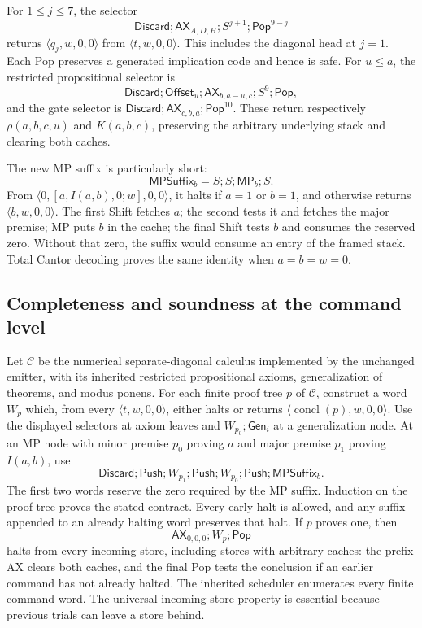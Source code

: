 For $1\le j\le7$, the selector
\[
 \mathsf{Discard};\mathsf{AX}_{A,D,H};S^{j+1};\mathsf{Pop}^{9-j}
\]
returns $\langle q_j,w,0,0\rangle$ from
$\langle t,w,0,0\rangle$.  This includes the diagonal head at $j=1$.
Each Pop preserves a generated implication code and hence is safe.
For $u\le a$, the restricted propositional selector is
\[
 \mathsf{Discard};\mathsf{Offset}_u;
       \mathsf{AX}_{b,a-u,c};S^9;\mathsf{Pop},
\]
and the gate selector is
$\mathsf{Discard};\mathsf{AX}_{c,b,a};\mathsf{Pop}^{10}$.
These return respectively $\rho(a,b,c,u)$ and $K(a,b,c)$,
preserving the arbitrary underlying stack and clearing both caches.

The new MP suffix is particularly short:
\[
 \mathsf{MPSuffix}_b=S;S;\mathsf{MP}_b;S.
\]
From $\langle0,[a,I(a,b),0;w],0,0\rangle$, it halts if
$a=1$ or $b=1$, and otherwise returns $\langle b,w,0,0\rangle$.
The first Shift fetches $a$; the second tests it and fetches the major
premise; MP puts $b$ in the cache; the final Shift tests $b$ and consumes
the reserved zero.  Without that zero, the suffix would consume an entry
of the framed stack.  Total Cantor decoding proves the same identity
when $a=b=w=0$.

\subsection{Completeness and soundness at the command level}

Let $\mathcal C$ be the numerical separate-diagonal calculus implemented
by the unchanged emitter, with its inherited restricted propositional
axioms, generalization of theorems, and modus ponens.
For each finite proof tree $p$ of $\mathcal C$, construct a word $W_p$
which, from every $\langle t,w,0,0\rangle$, either halts or returns
$\langle\operatorname{concl}(p),w,0,0\rangle$.
Use the displayed selectors at axiom leaves and
$W_{p_0};\mathsf{Gen}_i$ at a generalization node.  At an MP node with
minor premise $p_0$ proving $a$ and major premise $p_1$ proving $I(a,b)$,
use
\[
 \mathsf{Discard};\mathsf{Push};W_{p_1};\mathsf{Push};
                   W_{p_0};\mathsf{Push};\mathsf{MPSuffix}_b.
\]
The first two words reserve the zero required by the MP suffix.
Induction on the proof tree proves the stated contract.  Every early
halt is allowed, and any suffix appended to an already halting word
preserves that halt.  If $p$ proves one, then
\[
 \mathsf{AX}_{0,0,0};W_p;\mathsf{Pop}
\]
halts from every incoming store, including stores with arbitrary caches:
the prefix AX clears both caches, and the final Pop tests the conclusion
if an earlier command has not already halted.  The inherited scheduler
enumerates every finite command word.  The universal incoming-store
property is essential because previous trials can leave a store behind.

